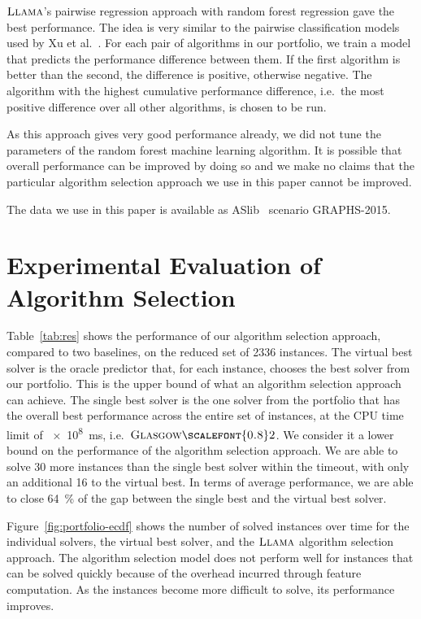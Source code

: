 \documentclass{llncs}
\newcommand{\GlasgowTwo}{$\textsc{Glasgow{\scalefont{0.8}2}}$\xspace}
\newcommand{\LLAMA}{$\textsc{Llama}$\xspace}
\begin{document}
\LLAMA's pairwise regression approach with random forest regression gave the best performance. The
idea is very similar to the pairwise classification models used by Xu et al.~\cite{xu_satzilla_2008}. For
each pair of algorithms in our portfolio, we train a model that predicts the performance difference
between them. If the first algorithm is better than the second, the difference is positive,
otherwise negative. The algorithm with the highest cumulative performance difference, i.e.\ the most
positive difference over all other algorithms, is chosen to be run.

As this approach gives very good performance already, we did not tune the parameters of the random
forest machine learning algorithm. It is possible that overall performance can be improved by doing
so and we make no claims that the particular algorithm selection approach we use in this paper
cannot be improved.

The data we use in this paper is available as ASlib~\cite{aslib} scenario GRAPHS-2015.

\section{Experimental Evaluation of Algorithm Selection}\label{sec:algsel-exps}

Table~\ref{tab:res} shows the performance of our algorithm selection approach, compared to two
baselines, on the reduced set of 2336 instances. The virtual best solver is the oracle predictor
that, for each instance, chooses the best solver from our portfolio. This is the upper bound of what
an algorithm selection approach can achieve. The single best solver is the one solver from the
portfolio that has the overall best performance across the entire set of instances, at the CPU time
limit of \SI{e8}{\ms}, i.e.\ \GlasgowTwo. We consider it a lower bound on the performance of the
algorithm selection approach.  We are able to solve 30 more instances than the single best solver
within the timeout, with only an additional 16 to the virtual best. In terms of average performance,
we are able to close \SI{64}{\percent} of the gap between the single best and the virtual
best solver.

Figure~\ref{fig:portfolio-ecdf} shows the number of solved instances over time
for the individual solvers, the virtual best solver, and the \LLAMA algorithm
selection approach. The algorithm selection model does not perform well for
instances that can be solved quickly because of the overhead incurred through
feature computation.  As the instances become more difficult to solve, its
performance improves.
\end{document}

